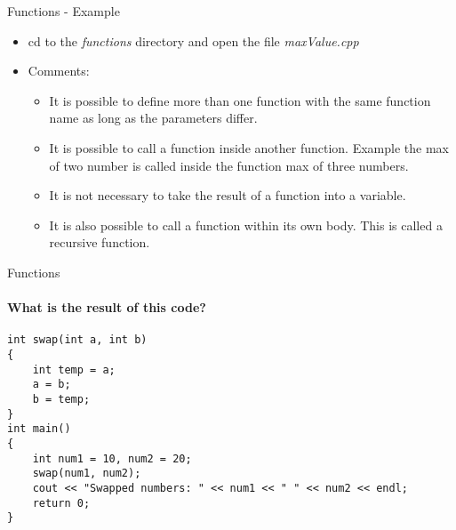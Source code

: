 \documentclass[aspectratio=169]{beamer}
\begin{document}
\begin{frame}[fragile]{Functions - Example}
	\begin{itemize}
		\item cd to the \textit{functions} directory and open the file \textit{maxValue.cpp}
		\item Comments:
		\begin{itemize}
			\item It is possible to define more than one function with the same function name as long as the parameters differ.
			\item It is possible to call a function inside another function. Example the max of two number is called inside the function max of three numbers.
			\item It is not necessary to take the result of a function into a variable.
			\item It is also possible to call a function within its own body. This is called a recursive function.
		\end{itemize}
	\end{itemize}
\end{frame}

\begin{frame}[fragile]{Functions}
	\framesubtitle{What is the result of this code?}
	
	\begin{lstlisting}
int swap(int a, int b)
{
    int temp = a;
    a = b;
    b = temp;
}
int main()
{
    int num1 = 10, num2 = 20;
    swap(num1, num2);
    cout << "Swapped numbers: " << num1 << " " << num2 << endl;
    return 0;
}
	\end{lstlisting}
\end{frame}
\end{document}
